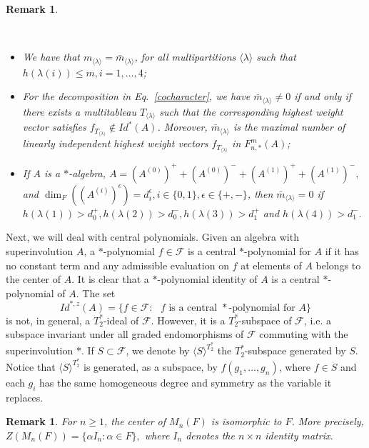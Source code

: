 \documentclass[10pt,a4paper]{amsart}
\newtheorem{remark}[theorem]{Remark}
\begin{document}
	\begin{remark}\label{multiplicities}
		
		\
		
		\begin{itemize}
			\item[1.] We have that  $m_{\langle \lambda \rangle}=\bar{m}_{\langle \lambda \rangle}$, for all multipartitions $\langle \lambda \rangle$ such that $h(\lambda(i))\leq m, i=1,\ldots,4$;
			
			\item[2.] For the decomposition in Eq.~\eqref{cocharacter}, we have $\bar{m}_{\langle \lambda \rangle}\neq 0$ if and only if there exists a multitableau $T_{\langle \lambda \rangle}$ such that the corresponding highest weight vector satisfies $f_{T_{\langle \lambda \rangle}}\notin Id^{*}(A)$. Moreover, $\bar{m}_{\langle \lambda \rangle}$ is the maximal
			number of linearly independent highest weight vectors $f_{T_{\langle \lambda \rangle}}$ in $F^m_{n,*}(A)$;
			\item[3.] If $A$ is a $*$-algebra, $A=(A^{(0)})^+ +(A^{(0)})^- + (A^{(1)})^+ + (A^{(1)})^-,$ and $\dim_F((A^{(i)})^{\epsilon})=d_i^{\epsilon}, i\in \{0,1\},\epsilon\in\{+,-\}$, then $\bar{m}_{\langle \lambda \rangle}= 0$ if $h(\lambda(1))>d_0^+, h(\lambda(2))>d_0^-,h(\lambda(3))>d_1^+$ and $h(\lambda(4))>d_1^-.$
		\end{itemize}
		
	\end{remark}
	
	Next, we will deal with central polynomials. Given an algebra with superinvolution $A$, a $*$-polynomial $f\in \mathcal{F}$ is a central $*$-polynomial for $A$ if it has no constant term and any admissible evaluation on $f$ at elements of $A$ belongs to the center of $A$. It is clear that a $*$-polynomial identity of $A$ is a central $\ast$-polynomial of $A$. The set $$Id^{*,z}(A)=\{f\in \mathcal{F}:\mbox{ $f$ is a central $*$-polynomial for $A$}\}$$ is not, in general, a $T_2^*$-ideal of $\mathcal{F}$. However, it is a $T_2^*$-subspace of $\mathcal{F}$, i.e. a subspace invariant under all graded endomorphisms of $\mathcal{F}$ commuting with the superinvolution $*$. If $S\subset \mathcal{F}$, we denote by $\langle S\rangle^{T_2^*}$ the $T_2^*$-subspace generated by $S$. Notice that $\langle S\rangle^{T_2^*}$ is generated, as a subspace, by $f(g_1,\ldots,g_n)$, where $f\in S$ and each $g_i$ has the same homogeneous degree and symmetry
as the variable it replaces.

     \begin{remark}\label{rem:center}
         For $n\geq 1$, the center of $M_n(F)$ is isomorphic to $F$. More precisely, $Z(M_n(F))=\{\alpha I_n:\alpha \in F\},$ where $I_n$ denotes the $n\times n$ identity matrix.
     \end{remark}
     
\end{document}
